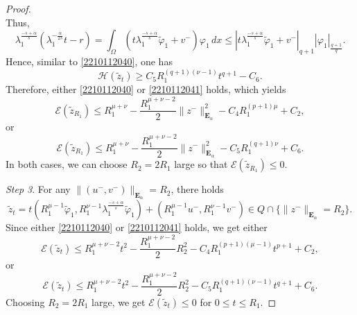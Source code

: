 \documentclass[10pt]{article}
\numberwithin{equation}{section}
\numberwithin{equation}{section}
\begin{document}
\begin{proof}
\[\]
Thus,
\[
\lambda_1^{\frac{-s+\alpha}{s}}(\lambda_1^{-\frac{\alpha}{2s}}t-r)=\int_{\Omega}(t\lambda_1^{\frac{-s+\alpha}{s}}\widetilde{\varphi}_1 +v^-)\varphi_1\, dx\le |t\lambda_1^{\frac{-s+\alpha}{s}}\widetilde{\varphi}_1 +v^-|_{q+1}|\varphi_1|_\frac{q+1}{q}.
\]
Hence, similar to \eqref{2210112040}, one has
\begin{equation}\label{2210112041}
\mathcal{H}(\widetilde{z}_t)\ge C_5 R_1^{(q+1)(\nu-1)}t^{q+1}-C_6.
\end{equation}
Therefore, either \eqref{2210112040} or \eqref{2210112041} holds, which yields
\[
\mathcal{E}(\widetilde{z}_{R_1})\le {R_1^{\mu+\nu}}- \frac{R_1^{\mu+\nu-2}}{2}\|z^-\|_{\mathbf{E}_{\alpha}}^2-C_4 R_1^{(p+1)\mu}+C_2,
\]
or
\[
\mathcal{E}(\widetilde{z}_{R_1})\le {R_1^{\mu+\nu}}- \frac{R_1^{\mu+\nu-2}}{2}\|z^-\|_{\mathbf{E}_{\alpha}}^2-C_5 R_1^{(q+1)\nu}+C_6.
\]
In both cases, we can choose $R_2=2{R_1}$ large so that $\mathcal{E}(\widetilde{z}_{R_1})\le 0$.

\smallskip
{\it Step 3}. For any $\|(u^-, v^-)\|_{\mathbf{E}_{\alpha}}=R_2$, there holds
$$\widetilde{z}_t=t(R_1^{\mu-1}\widetilde{\varphi}_1, R_1^{\nu-1}\lambda_1^{\frac{-s+\alpha}{s}}\widetilde{\varphi}_1)+(R_1^{\mu-1}u^-, R_1^{\nu-1}v^-)\in Q\cap \{\|z^-\|_{\mathbf{E}_{\alpha}}=R_2\}.$$
Since either \eqref{2210112040} or \eqref{2210112041} holds, we get either
\[
\mathcal{E}(\widetilde{z}_t)\le {R_1^{\mu+\nu-2}t^2}- \frac{R_1^{\mu+\nu-2}}{2}R_2^2-C_4 R_1^{(p+1)(\mu-1)}t^{p+1}+C_2,
\]
or
\[
\mathcal{E}(\widetilde{z}_t)\le {R_1^{\mu+\nu-2}t^2}- \frac{R_1^{\mu+\nu-2}}{2}R_2^2-C_5 R_1^{(q+1)(\nu-1)}t^{q+1}+C_6.
\]
Choosing $R_2=2{R_1}$ large, we get $\mathcal{E}(\widetilde{z}_t)\le 0$ for $0\le t \le R_1$.
\end{proof}
\end{document}
